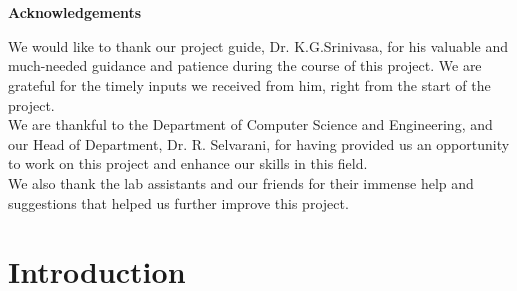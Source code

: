 \documentclass[12pt]{article}			%
\begin{document}
\section*{}
\begin{center}
{\LARGE \bf Acknowledgements}
\\[6ex]
\end{center}
We would like to thank our project guide, Dr. K.G.Srinivasa, for his valuable and much-needed guidance and patience during the course of this project. We are grateful for the timely inputs we received from him, right from the start of the project.\\[2ex]
We are thankful to the Department of Computer Science and Engineering, and our Head of Department, Dr. R. Selvarani, for having provided us an opportunity to work on this project and enhance our skills in this field.\\[2ex]
We also thank the lab assistants and our friends for their immense help and suggestions that helped us further improve this project. 

\newpage				%

\section*{}
\tableofcontents			%

\newpage				%
\section*{}
\listoffigures


\newpage				%
\section*{}
\listoftables
\newpage				%

\section{ Introduction }	%
\end{document}
